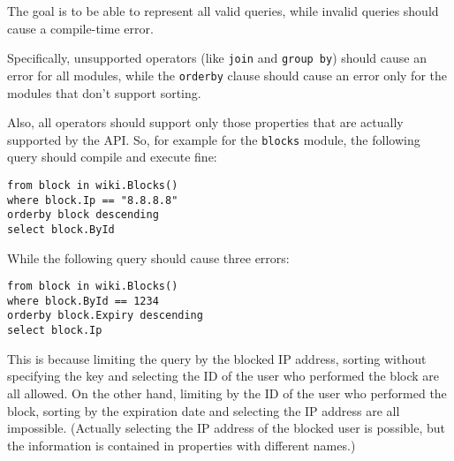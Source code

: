 The goal is to be able to represent all valid queries, while invalid queries should cause a compile-time error.

Specifically, unsupported operators (like \lstinline{join} and \lstinline{group by}) should cause an error for all modules,
while the \lstinline{orderby} clause should cause an error only for the modules that don't support sorting.

Also, all operators should support only those properties that are actually supported by the API.
So, for example for the \verb,blocks, module, the following query should compile and execute fine:

\begin{lstlisting}
from block in wiki.Blocks()
where block.Ip == "8.8.8.8"
orderby block descending
select block.ById
\end{lstlisting}

While the following query should cause three errors:

\begin{lstlisting}
from block in wiki.Blocks()
where block.ById == 1234
orderby block.Expiry descending
select block.Ip
\end{lstlisting}

This is because limiting the query by the blocked IP address, sorting without specifying the key and selecting the ID of the user who performed the block are all allowed.
On the other hand, limiting by the ID of the user who performed the block, sorting by the expiration date and selecting the IP address are all impossible.
(Actually selecting the IP address of the blocked user is possible, but the information is contained in properties with different names.)